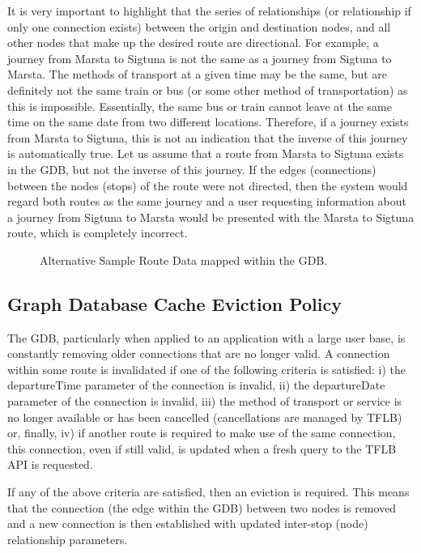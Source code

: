 \documentclass[12pt]{article}   	%
\begin{document}
It is very important to highlight that the series of relationships (or relationship if only one connection exists) between the origin and destination nodes, and all other nodes that make up the desired route are directional. For example, a journey from Marsta to Sigtuna is not the same as a journey from Sigtuna to Marsta. The methods of transport at a given time may be the same, but are definitely not the same train or bus (or some other method of transportation) as this is impossible. Essentially, the same bus or train cannot leave at the same time on the same date from two different locations. Therefore, if a journey exists from Marsta to Sigtuna, this is not an indication that the inverse of this journey is automatically true. Let us assume that a route from Marsta to Sigtuna exists in the GDB, but not the inverse of this journey. If the edges (connections) between the nodes (stops) of the route were not directed, then the system would regard both routes as the same journey and a user requesting information about a journey from Sigtuna to Marsta would be presented with the Marsta to Sigtuna route, which is completely incorrect.

\noindent
\hfill
\begin{figure}[htp]

\caption{Alternative Sample Route Data mapped within the GDB.}
\end{figure}
\hfill

\newpage

\subsection{Graph Database Cache Eviction Policy}
The GDB, particularly when applied to an application with a large user base, is constantly removing older connections that are no longer valid. A connection within some route is invalidated if one of the following criteria is satisfied: i) the departureTime parameter of the connection is invalid, ii) the departureDate parameter of the connection is invalid, iii) the method of transport or service is no longer available or has been cancelled (cancellations are managed by TFLB) or, finally, iv) if another route is required to make use of the same connection, this connection, even if still valid, is updated when a fresh query to the TFLB API is requested.

If any of the above criteria are satisfied, then an eviction is required. This means that the connection (the edge within the GDB) between two nodes is removed and a new connection is then established with updated inter-stop (node) relationship parameters.
\end{document}

